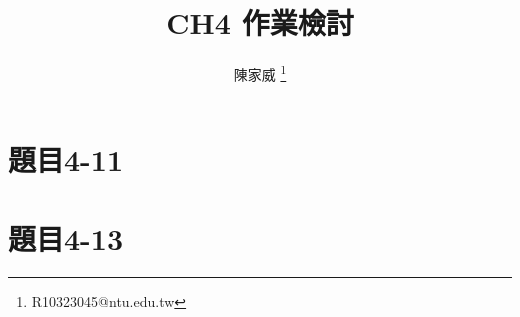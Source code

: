 \documentclass[mathserif]{beamer}
\title{CH4 作業檢討}
\author{陳家威 \thanks{R10323045@ntu.edu.tw}}
\begin{document}
    \begin{frame}
        \maketitle
    \end{frame}

    \section{題目4-11}

    
    
    

    \section{題目4-13}
    
    
\end{document}
